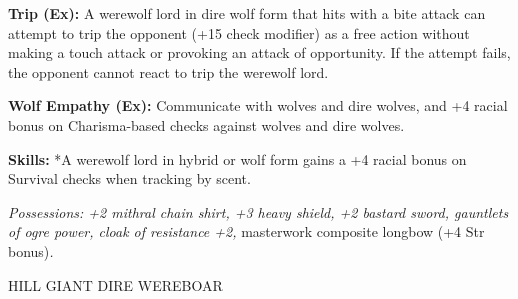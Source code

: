 \documentclass{article}
\begin{document}
\textbf{Trip (Ex):} A werewolf lord in dire wolf form that hits with a bite attack 
can attempt to trip the opponent (+15 check modifier) as a free action without 
making a touch attack or provoking an attack of opportunity. If the attempt fails, 
the opponent cannot react to trip the werewolf lord.

\textbf{Wolf Empathy (Ex): }Communicate with wolves and dire wolves, and +4 racial 
bonus on Charisma-based checks against wolves and dire wolves.

\textbf{Skills: }*A werewolf lord in hybrid or wolf form gains a +4 racial bonus 
on Survival checks when tracking by scent.

\textit{Possessions: +2 mithral chain shirt, +3 heavy shield, +2 bastard sword, 
gauntlets of ogre power, cloak of resistance +2, }masterwork composite longbow 
(+4 Str bonus)\textit{.}

\vspace{12pt}
HILL GIANT DIRE WEREBOAR
\end{document}
